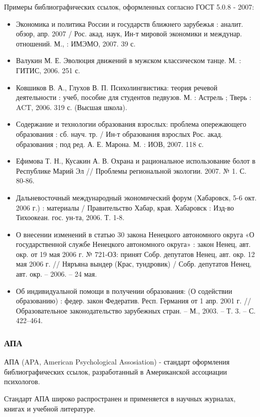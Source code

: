 Примеры библиографических ссылок, оформленных согласно ГОСТ 5.0.8 - 2007:
\begin{itemize}
	\item Экономика и политика России и государств ближнего зарубежья : аналит. обзор, апр. 2007 / Рос. акад. наук, Ин-т мировой экономики и междунар. отношений. М., : ИМЭМО, 2007. 39 с.
	\item Валукин М. Е. Эволюция движений в мужском классическом танце. М. : ГИТИС, 2006. 251 с.
	\item Ковшиков В. А., Глухов В. П. Психолингвистика: теория речевой деятельности : учеб, пособие для студентов педвузов. М. : Астрель ; Тверь : ACT, 2006. 319 с. (Высшая школа).
	\item Содержание и технологии образования взрослых: проблема опережающего образования : сб. науч. тр. / Ин-т образования взрослых Рос. акад. образования ; под ред. А. Е. Марона. М. : ИОВ, 2007. 118 с.
	\item Ефимова Т. Н., Кусакин А. В. Охрана и рациональное использование болот в Республике Марий Эл // Проблемы региональной экологии. 2007. № 1. С. 80-86.
	\item Дальневосточный международный экономический форум (Хабаровск, 5-6 окт. 2006 г.) : материалы / Правительство Хабар, края. Хабаровск : Изд-во Тихоокеан. гос. ун-та, 2006. Т. 1-8.
	\item О внесении изменений в статью 30 закона Ненецкого автономного округа «О государственной службе Ненецкого автономного округа» : закон Ненец, авт. окр. от 19 мая 2006 г. № 721-ОЗ: принят Собр. депутатов Ненец, авт. окр. 12 мая 2006 г. // Няръяна вындер (Крас, тундровик) / Собр. депутатов Ненец, авт. окр. -- 2006. -- 24 мая.
	\item Об индивидуальной помощи в получении образования: (О содействии образованию) : федер. закон Федератив. Респ. Германия от 1 апр. 2001 г. // Образовательное законодательство зарубежных стран. -- М., 2003. -- Т. 3. -- С. 422--464.
\end{itemize}

\subsubsection*{АПА}

АПА (APA, American Psychological Assosiation) - стандарт оформления библиографических ссылок, разработанный в Американской ассоциации психологов.

Стандарт АПА широко распространен и применяется в научных журналах, книгах и учебной литературе.

